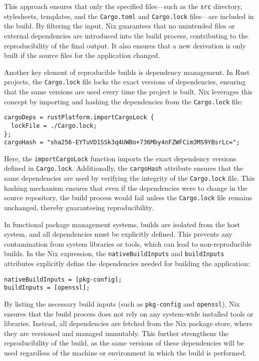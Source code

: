 This approach ensures that only the specified files—such as the \texttt{src} directory,
stylesheets, templates, and the \texttt{Cargo.toml} and \texttt{Cargo.lock} files—are
included in the build. By filtering the input, Nix guarantees that no unintended
files or external dependencies are introduced into the build process, contributing
to the reproducibility of the final output.
It also ensures that a new derivation is only built
if the source files for the application changed.

Another key element of reproducible builds is dependency management. In Rust
projects, the \texttt{Cargo.lock} file locks the exact versions of dependencies,
ensuring that the same versions are used every time the project is built. Nix
leverages this concept by importing and hashing the dependencies from the
\texttt{Cargo.lock} file:

\begin{lstlisting}[caption={Rust dependency management in Nix}]
cargoDeps = rustPlatform.importCargoLock {
  lockFile = ./Cargo.lock;
};
cargoHash = "sha256-EYTuVD1SSk3q4UWBo+736Mby4nFZWFCim3MS9YBsrLc=";
\end{lstlisting}

Here, the \texttt{importCargoLock} function imports the exact dependency versions
defined in \texttt{Cargo.lock}. Additionally, the \texttt{cargoHash} attribute ensures
that the same dependencies are used by verifying the integrity of the \texttt{Cargo.lock}
file. This hashing mechanism ensures that even if the dependencies were to change
in the source repository, the build process would fail unless the \texttt{Cargo.lock}
file remains unchanged, thereby guaranteeing reproducibility.

In functional package management systems, builds are isolated from the host system,
and all dependencies must be explicitly defined. This prevents any contamination
from system libraries or tools, which can lead to non-reproducible builds. In the
Nix expression, the \texttt{nativeBuildInputs} and \texttt{buildInputs} attributes
explicitly define the dependencies needed for building the application:

\begin{lstlisting}[caption={Defining build dependencies in Nix}]
nativeBuildInputs = [pkg-config];
buildInputs = [openssl];
\end{lstlisting}

By listing the necessary build inputs (such as \texttt{pkg-config} and \texttt{openssl}),
Nix ensures that the build process does not rely on any system-wide installed tools
or libraries. Instead, all dependencies are fetched from the Nix package store,
where they are versioned and managed immutably. This further strengthens the
reproducibility of the build, as the same versions of these dependencies will be
used regardless of the machine or environment in which the build is performed.

